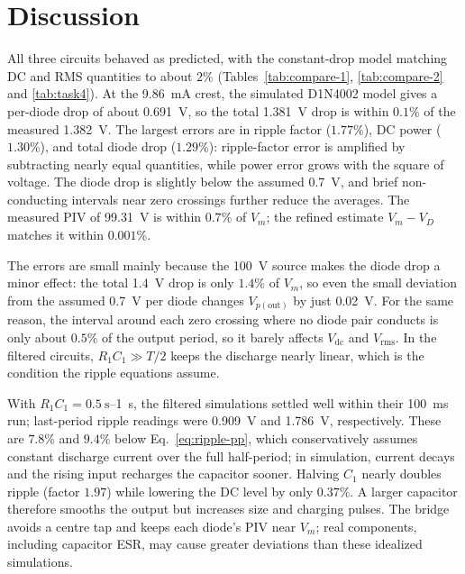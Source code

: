 \documentclass[12pt,a4paper]{article}
\begin{document}
	\section{Discussion}
	All three circuits behaved as predicted, with the constant-drop model matching DC and RMS quantities to about $2\%$ (Tables~\ref{tab:compare-1}, \ref{tab:compare-2} and \ref{tab:task4}). At the \SI{9.86}{\milli\ampere} crest, the simulated D1N4002 model gives a per-diode drop of about \SI{0.691}{\volt}, so the total \SI{1.381}{\volt} drop is within $0.1\%$ of the measured \SI{1.382}{\volt}. The largest errors are in ripple factor ($1.77\%$), DC power ($1.30\%$), and total diode drop ($1.29\%$): ripple-factor error is amplified by subtracting nearly equal quantities, while power error grows with the square of voltage. The diode drop is slightly below the assumed \SI{0.7}{\volt}, and brief non-conducting intervals near zero crossings further reduce the averages. The measured PIV of \SI{99.31}{\volt} is within $0.7\%$ of $V_m$; the refined estimate $V_m-V_D$ matches it within $0.001\%$.
	
	The errors are small mainly because the \SI{100}{\volt} source makes the diode drop a minor effect: the total \SI{1.4}{\volt} drop is only $1.4\%$ of $V_m$, so even the small deviation from the assumed \SI{0.7}{\volt} per diode changes $V_{p(\mathrm{out})}$ by just \SI{0.02}{\volt}. For the same reason, the interval around each zero crossing where no diode pair conducts is only about $0.5\%$ of the output period, so it barely affects $V_\mathrm{dc}$ and $V_\mathrm{rms}$. In the filtered circuits, $R_1C_1\gg T/2$ keeps the discharge nearly linear, which is the condition the ripple equations assume.
	
	With $R_1C_1=\SI{0.5}{\second}$--\SI{1}{\second}, the filtered simulations settled well within their \SI{100}{\milli\second} run; last-period ripple readings were \SI{0.909}{\volt} and \SI{1.786}{\volt}, respectively. These are $7.8\%$ and $9.4\%$ below Eq.~\eqref{eq:ripple-pp}, which conservatively assumes constant discharge current over the full half-period; in simulation, current decays and the rising input recharges the capacitor sooner. Halving $C_1$ nearly doubles ripple (factor $1.97$) while lowering the DC level by only $0.37\%$. A larger capacitor therefore smooths the output but increases size and charging pulses. The bridge avoids a centre tap and keeps each diode's PIV near $V_m$; real components, including capacitor ESR, may cause greater deviations than these idealized simulations.
	
\end{document}
